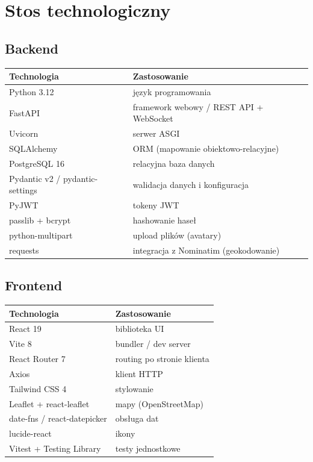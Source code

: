 \documentclass[11pt,a4paper]{article}
\begin{document}
\section{Stos technologiczny}

\subsection{Backend}
\begin{longtable}{L{4cm} L{9cm}}
\toprule
\textbf{Technologia} & \textbf{Zastosowanie} \\
\midrule
\endhead
Python 3.12 & język programowania \\
FastAPI & framework webowy / REST API + WebSocket \\
Uvicorn & serwer ASGI \\
SQLAlchemy & ORM (mapowanie obiektowo-relacyjne) \\
PostgreSQL 16 & relacyjna baza danych \\
Pydantic v2 / pydantic-settings & walidacja danych i konfiguracja \\
PyJWT & tokeny JWT \\
passlib + bcrypt & hashowanie haseł \\
python-multipart & upload plików (avatary) \\
requests & integracja z Nominatim (geokodowanie) \\
\bottomrule
\end{longtable}

\subsection{Frontend}
\begin{longtable}{L{4cm} L{9cm}}
\toprule
\textbf{Technologia} & \textbf{Zastosowanie} \\
\midrule
\endhead
React 19 & biblioteka UI \\
Vite 8 & bundler / dev server \\
React Router 7 & routing po stronie klienta \\
Axios & klient HTTP \\
Tailwind CSS 4 & stylowanie \\
Leaflet + react-leaflet & mapy (OpenStreetMap) \\
date-fns / react-datepicker & obsługa dat \\
lucide-react & ikony \\
Vitest + Testing Library & testy jednostkowe \\
\bottomrule
\end{longtable}
\end{document}
